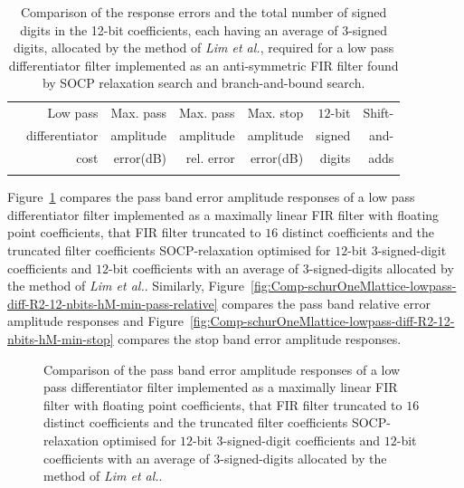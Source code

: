 \documentclass[a4paper,twoside,10pt,english]{article}
\newcommand{\DesignOfSchurLatticeFiltersPdfScale}{1}
\begin{document}
\begin{table}
\centering
\begin{threeparttable}
\begin{tabular}{lrrrrrr} \\ \toprule
 &Low pass        &Max. pass&Max. pass &Max. stop &$12$-bit&Shift-\\
 &differentiator  &amplitude&amplitude &amplitude &signed  &and-  \\
 &cost            &error(dB)&rel. error&error(dB) &digits  &adds  \\
\midrule

\\ \bottomrule
\end{tabular}
\end{threeparttable}
\caption[Comparison of low pass differentiator filter FIR implementations]
{Comparison of the response errors and the total number of signed digits in the
  12-bit coefficients, each having an average of 3-signed digits, allocated by
  the method of \emph{Lim et al.}, required for a low pass differentiator filter
  implemented as an anti-symmetric FIR filter found by SOCP relaxation search
  and branch-and-bound search.}
\label{tab:Comp-schurOneMlattice-lowpass-diff-R2-12-nbits-hM-min-cost}
\end{table}

Figure~\ref{fig:Comp-schurOneMlattice-lowpass-diff-R2-12-nbits-hM-min-pass}
compares the pass band error amplitude responses of a low pass
differentiator filter implemented as a maximally linear FIR filter with floating
point coefficients, that FIR filter truncated to $16$ distinct coefficients and
the truncated filter coefficients SOCP-relaxation optimised for $12$-bit
$3$-signed-digit coefficients and $12$-bit coefficients with an average of
$3$-signed-digits allocated by the method of \emph{Lim et al.}.
Similarly,
Figure~\ref{fig:Comp-schurOneMlattice-lowpass-diff-R2-12-nbits-hM-min-pass-relative}
compares the pass band relative error amplitude responses and
Figure~\ref{fig:Comp-schurOneMlattice-lowpass-diff-R2-12-nbits-hM-min-stop}
compares the stop band error amplitude responses.

\begin{figure}
\centering
\scalebox{\DesignOfSchurLatticeFiltersPdfScale}{}
\caption{Comparison of the pass band error amplitude responses of a low pass
  differentiator filter implemented as a maximally linear FIR filter with
  floating point coefficients, that FIR filter truncated to $16$ distinct
  coefficients and the truncated filter coefficients SOCP-relaxation optimised
  for $12$-bit $3$-signed-digit coefficients and $12$-bit coefficients with an
  average of $3$-signed-digits allocated by the method of \emph{Lim et al.}.}
\label{fig:Comp-schurOneMlattice-lowpass-diff-R2-12-nbits-hM-min-pass}
\end{figure}
\end{document}
